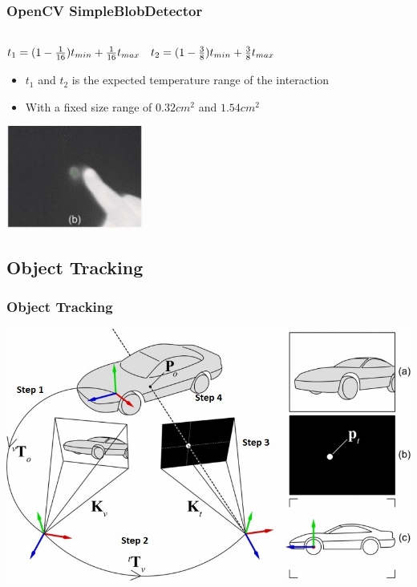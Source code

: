 \documentclass{beamer}
\begin{document}
\begin{frame}
\frametitle{OpenCV SimpleBlobDetector}
\begin{center}
	\(
\begin{matrix} \\
 t_{1}=(1-{1\over 16})t_{ min}+{1\over 16}t_{ max} & t_{2}=(1-{3\over 8})t_{ min}+{3\over 8}t_{ max}\cr 
 \end{matrix} 
\)
\end{center}
	\begin{itemize}
		\item \(t_{1}\) and \(t_{2}\) is the expected temperature range of the interaction
		\item With a fixed size range of \(0.32cm^2\) and \(1.54cm^2\)
	\end{itemize}
	\begin{center}
\includegraphics[width=4.5cm]{images/ThermalSnip}

	\cite{Thermal}
\end{center}
\end{frame}

\subsection{Object Tracking}
\begin{frame}	
\frametitle{Object Tracking}
	\includegraphics[width=\textwidth]{images/Tracking}
	\begin{center}
	\cite{Thermal}
	\end{center}
\end{frame}
\end{document}
